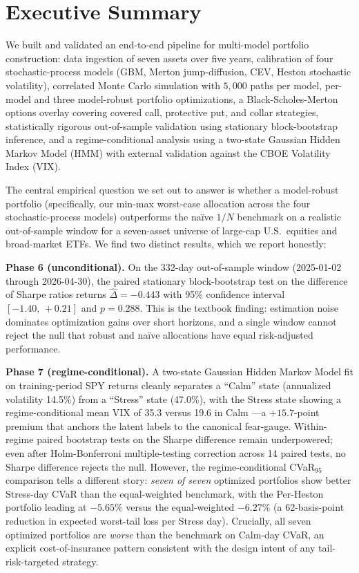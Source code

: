 \documentclass[11pt,letterpaper]{article}
\begin{document}
\section*{Executive Summary}

We built and validated an end-to-end pipeline for multi-model portfolio construction: data ingestion of seven assets over five years, calibration of four stochastic-process models (GBM, Merton jump-diffusion, CEV, Heston stochastic volatility), correlated Monte Carlo simulation with $5{,}000$ paths per model, per-model and three model-robust portfolio optimizations, a Black-Scholes-Merton options overlay covering covered call, protective put, and collar strategies, statistically rigorous out-of-sample validation using stationary block-bootstrap inference, and a regime-conditional analysis using a two-state Gaussian Hidden Markov Model (HMM) with external validation against the CBOE Volatility Index (VIX).

The central empirical question we set out to answer is whether a model-robust portfolio (specifically, our min-max worst-case allocation across the four stochastic-process models) outperforms the naïve $1/N$ benchmark on a realistic out-of-sample window for a seven-asset universe of large-cap U.S.\ equities and broad-market ETFs. We find two distinct results, which we report honestly:

\textbf{Phase 6 (unconditional).} On the 332-day out-of-sample window (2025-01-02 through 2026-04-30), the paired stationary block-bootstrap test on the difference of Sharpe ratios returns $\widehat{\Delta} = -0.443$ with 95\% confidence interval $[-1.40,\, +0.21]$ and $p = 0.288$. This is the textbook \citet{demiguel2009optimal} finding: estimation noise dominates optimization gains over short horizons, and a single window cannot reject the null that robust and naïve allocations have equal risk-adjusted performance.

\textbf{Phase 7 (regime-conditional).} A two-state Gaussian Hidden Markov Model fit on training-period SPY returns cleanly separates a ``Calm'' state (annualized volatility 14.5\%) from a ``Stress'' state (47.0\%), with the Stress state showing a regime-conditional mean VIX of 35.3 versus 19.6 in Calm —a $+15.7$-point premium that anchors the latent labels to the canonical fear-gauge. Within-regime paired bootstrap tests on the Sharpe difference remain underpowered; even after Holm-Bonferroni multiple-testing correction across 14 paired tests, no Sharpe difference rejects the null. However, the regime-conditional CVaR$_{95}$ comparison tells a different story: \emph{seven of seven} optimized portfolios show better Stress-day CVaR than the equal-weighted benchmark, with the Per-Heston portfolio leading at $-5.65\%$ versus the equal-weighted $-6.27\%$ (a 62-basis-point reduction in expected worst-tail loss per Stress day). Crucially, all seven optimized portfolios are \emph{worse} than the benchmark on Calm-day CVaR, an explicit cost-of-insurance pattern consistent with the design intent of any tail-risk-targeted strategy.
\end{document}
